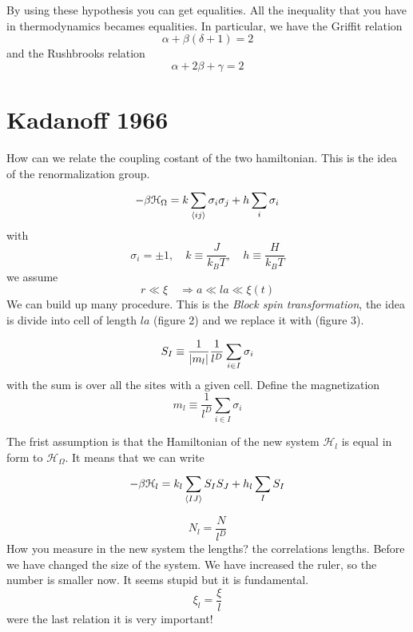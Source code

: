 \documentclass[../main/main.tex]{subfiles}
\begin{document}
By using these hypothesis you can get equalities. All the inequality that you have in thermodynamics becames equalities.
In particular, we have the Griffit relation
\begin{equation}
  \alpha + \beta (\delta +1) = 2
\end{equation}
and the Rushbrooks relation
\begin{equation}
  \alpha + 2 \beta + \gamma = 2
\end{equation}

\section{Kadanoff 1966}
How can we relate the coupling costant of the two hamiltonian. This is the idea of the renormalization group.
\begin{equation}
  - \beta \mathcal{H}_{\Omega } = k \sum_{\expval{ij} }^{} \sigma _i \sigma _j + h \sum_{i}^{} \sigma _i
\end{equation}
with
\begin{equation}
  \sigma _i = \pm 1, \quad k \equiv \frac{J}{k_B T}, \quad h \equiv \frac{H}{k_B T}
\end{equation}
we assume
\begin{equation}
  r \ll \xi  \quad \Rightarrow a \ll l a \ll \xi (t)
\end{equation}
We can build up many procedure.
This is the \emph{Block spin transformation}, the idea is divide into cell of length \( la \) (figure 2) and we replace it with (figure 3).

\begin{equation}
  S_I \equiv \frac{1}{\abs{m_l} } \frac{1}{l^D} \sum_{i \in I}^{}  \sigma _i
\end{equation}
with the sum is over all the sites with a given cell.
Define the magnetization
\begin{equation}
  m_l \equiv \frac{1}{l^D} \sum_{i \in I}^{} \sigma _i
\end{equation}

The frist assumption is that the Hamiltonian of the new system \( \mathcal{H}_l \) is equal in form to \( \mathcal{H}_ \Omega  \). It means that we can write
\begin{equation}
  - \beta \mathcal{H}_l = k_l \sum_{\expval{IJ} }^{} S_I S_J  + h_l \sum_{I}^{} S_I
\end{equation}

\begin{equation}
  N_l = \frac{N}{l^D}
\end{equation}
How you measure in the new system the lengths? the correlations lengths. Before we have changed the size of the system. We have increased the ruler, so the number is smaller now. It seems stupid but it is fundamental.
\begin{equation}
  \xi _l = \frac{\xi }{l}
\end{equation}
were the last relation it is very important!
\end{document}
